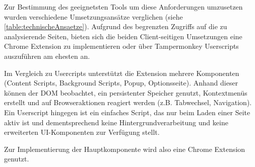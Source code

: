 Zur Bestimmung des geeignetsten Tools um diese Anforderungen umzusetzen wurden verschiedene Umsetzungsansätze verglichen (siehe \ref{table:technischeAnsaetze}).
Aufgrund des begrenzten Zugriffs auf die zu analysierende Seiten, bieten sich die beiden Client-seitigen Umsetzungen 
eine Chrome Extension zu implementieren oder über Tampermonkey Userscripts auszuführen am ehesten an.

Im Vergleich zu Usercripts unterstützt die Extension mehrere Komponenten (Content Scripts, Background Scripts, Popup, Optionsseite).
Anhand dieser können der DOM beobachtet, ein persistenter Speicher genutzt, Kontextmenüs erstellt und auf Browseraktionen reagiert werden (z.B. Tabwechsel, Navigation).
Ein Userscript hingegen ist ein einfaches Script, das nur beim Laden einer Seite aktiv ist und dementsprechend keine Hintergrundverarbeitung und keine erweiterten UI-Komponenten
zur Verfügung stellt.

Zur Implementierung der Hauptkomponente wird also eine Chrome Extension genutzt.

    
    
    